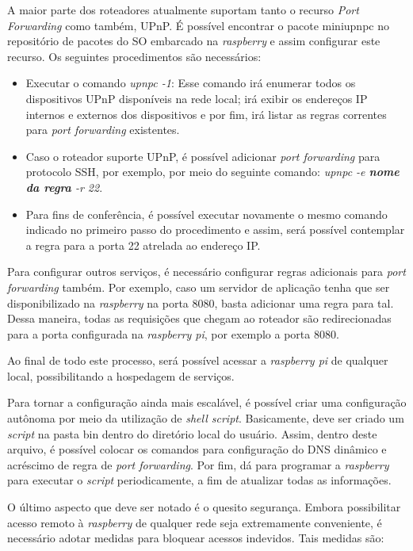 A maior parte dos roteadores atualmente suportam tanto o recurso \textit{Port Forwarding} como também, UPnP. É possível encontrar o pacote miniupnpc no repositório de pacotes do SO embarcado na \textit{raspberry} e assim configurar este recurso. Os seguintes procedimentos são necessários:

\begin{itemize}
  \item Executar o comando \textit{upnpc -1}: Esse comando irá enumerar todos os dispositivos UPnP disponíveis na rede local; irá exibir os endereços IP internos e externos dos dispositivos e por fim, irá listar as regras correntes para \textit{port forwarding} existentes.
  \item Caso o roteador suporte UPnP, é possível adicionar \textit{port forwarding} para protocolo SSH, por exemplo, por meio do seguinte comando: \textit{upnpc -e \textbf{nome da regra} -r 22}.
  \item Para fins de conferência, é possível executar novamente o mesmo comando indicado no primeiro passo do procedimento e assim, será possível contemplar a regra para a porta 22 atrelada ao endereço IP.
\end{itemize}

Para configurar outros serviços, é necessário configurar regras adicionais para \textit{port forwarding} também. Por exemplo, caso um servidor de aplicação tenha que ser disponibilizado na \textit{raspberry} na porta 8080, basta adicionar uma regra para tal. Dessa maneira, todas as requisições que chegam ao roteador são redirecionadas para a porta configurada na \textit{raspberry pi}, por exemplo a porta 8080.

Ao final de todo este processo, será possível acessar a \textit{raspberry pi} de qualquer local, possibilitando a hospedagem de serviços.

Para tornar a configuração ainda mais escalável, é possível criar uma configuração autônoma por meio da utilização de \textit{shell script}. Basicamente, deve ser criado um \textit{script} na pasta bin dentro do diretório local do usuário. Assim, dentro deste arquivo, é possível colocar os comandos para configuração do DNS dinâmico e acréscimo de regra de \textit{port forwarding}. Por fim, dá para programar a \textit{raspberry} para executar o \textit{script} periodicamente, a fim de atualizar todas as informações.

O último aspecto que deve ser notado é o quesito segurança. Embora possibilitar acesso remoto à \textit{raspberry} de qualquer rede seja extremamente conveniente, é necessário adotar medidas para bloquear acessos indevidos. Tais medidas são:

